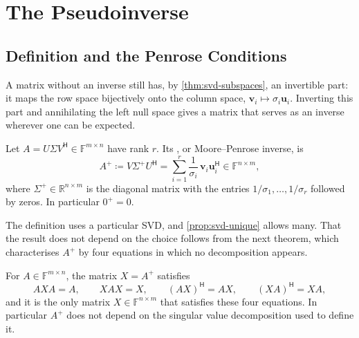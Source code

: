 \section{The Pseudoinverse}
\label{sec:pseudoinverse}

\subsection{Definition and the Penrose Conditions}

A matrix without an inverse still has, by \cref{thm:svd-subspaces}, an invertible part: it maps the row space bijectively onto the column space, $\mathbf v_i\mapsto\sigma_i\mathbf u_i$. Inverting this part and annihilating the left null space gives a matrix that serves as an inverse wherever one can be expected.

\begin{definition}[Pseudoinverse]
\label{def:pseudoinverse}
Let $A=U\Sigma V^{\mathsf H}\in\mathbb F^{m\times n}$ have rank $r$. Its , or Moore--Penrose inverse, is
\[
A^+\coloneqq V\Sigma^+U^{\mathsf H}=\sum_{i=1}^r\frac1{\sigma_i}\,\mathbf v_i\mathbf u_i^{\mathsf H}\in\mathbb F^{n\times m},
\]
where $\Sigma^+\in\mathbb R^{n\times m}$ is the diagonal matrix with the entries $1/\sigma_1,\ldots,1/\sigma_r$ followed by zeros. In particular $0^+=0$.
\end{definition}

The definition uses a particular SVD, and \cref{prop:svd-unique} allows many. That the result does not depend on the choice follows from the next theorem, which characterises $A^+$ by four equations in which no decomposition appears.

\begin{theorem}
\label{thm:penrose}
For $A\in\mathbb F^{m\times n}$, the matrix $X=A^+$ satisfies
\[
AXA=A,\qquad XAX=X,\qquad(AX)^{\mathsf H}=AX,\qquad(XA)^{\mathsf H}=XA ,
\]
and it is the only matrix $X\in\mathbb F^{n\times m}$ that satisfies these four equations. In particular $A^+$ does not depend on the singular value decomposition used to define it.
\end{theorem}

